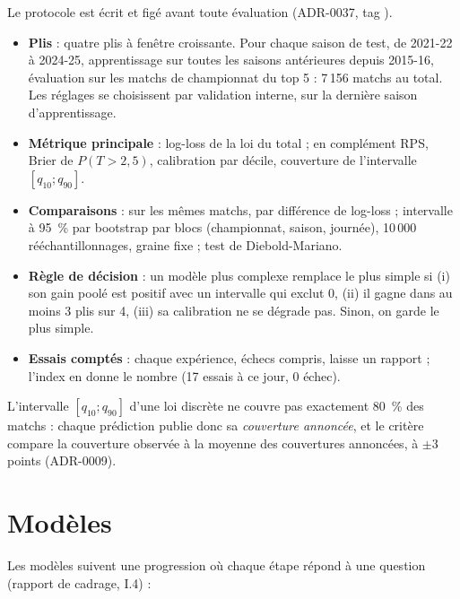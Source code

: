 Le protocole est écrit et figé avant toute évaluation (ADR-0037, tag ).

\begin{itemize}
  \item \textbf{Plis} : quatre plis à fenêtre croissante. Pour chaque saison de test, de 2021-22 à
        2024-25, apprentissage sur toutes les saisons antérieures depuis 2015-16, évaluation sur les
        matchs de championnat du top 5 : 7\,156 matchs au total. Les réglages se choisissent par
        validation interne, sur la dernière saison d'apprentissage.
  \item \textbf{Métrique principale} : log-loss de la loi du total ; en complément RPS, Brier de
        \(P(T > 2{,}5)\), calibration par décile, couverture de l'intervalle \([q_{10} ; q_{90}]\).
  \item \textbf{Comparaisons} : sur les mêmes matchs, par différence de log-loss ; intervalle à 95~\%
        par bootstrap par blocs (championnat, saison, journée), 10\,000 rééchantillonnages, graine
        fixe ; test de Diebold-Mariano.
  \item \textbf{Règle de décision} : un modèle plus complexe remplace le plus simple si (i) son gain
        poolé est positif avec un intervalle qui exclut 0, (ii) il gagne dans au moins 3 plis sur 4,
        (iii) sa calibration ne se dégrade pas. Sinon, on garde le plus simple.
  \item \textbf{Essais comptés} : chaque expérience, échecs compris, laisse un rapport ; l'index en
        donne le nombre (17 essais à ce jour, 0 échec).
\end{itemize}

L'intervalle \([q_{10} ; q_{90}]\) d'une loi discrète ne couvre pas exactement 80~\% des matchs : chaque
prédiction publie donc sa \emph{couverture annoncée}, et le critère compare la couverture observée à la
moyenne des couvertures annoncées, à \(\pm 3\) points (ADR-0009).

\section{Modèles}

Les modèles suivent une progression où chaque étape répond à une question (rapport de cadrage, I.4) :

